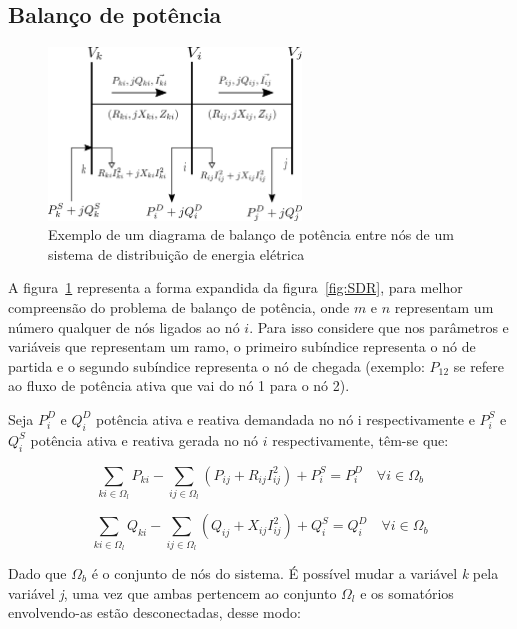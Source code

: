 \subsection{Balanço de potência}

\begin{figure}[H]
    \centering
    \includegraphics[width=0.6\textwidth]{3_Methodology/diagrama_nos.png}
    \caption{Exemplo de um diagrama de balanço de potência entre nós de um sistema de distribuição de energia elétrica}
    \label{fig:balanco_pot}
\end{figure}

A figura~\ref{fig:balanco_pot} representa a forma expandida da figura~\ref{fig:SDR}, para melhor compreensão do problema de balanço de potência, onde $m$ e $n$ representam um número qualquer de nós ligados ao nó $i$. 
Para isso considere que nos parâmetros e variáveis que representam um ramo, o primeiro subíndice representa o nó de partida e o segundo subíndice representa o nó de chegada (exemplo: $P_{12}$ se refere ao fluxo de potência ativa que vai do nó 1 para o nó 2).

Seja $P_{i}^{D}$ e $Q_{i}^{D}$ potência ativa e reativa demandada no nó i respectivamente e $P_{i}^{S}$ e $Q_{i}^{S}$ potência ativa e reativa gerada no nó $i$ respectivamente, têm-se que:

\begin{equation*}
    \sum_{ki\in\Omega_{l}}P_{ki} - \sum_{ij\in\Omega_{l}}(P_{ij} + R_{ij}I_{ij}^{2}) + P_{i}^{S} = P_{i}^{D}\quad\forall i \in\Omega_{b}
\end{equation*}

\begin{equation*}
    \sum_{ki\in\Omega_{l}}Q_{ki} - \sum_{ij\in\Omega_{l}}(Q_{ij} + X_{ij}I_{ij}^{2}) + Q_{i}^{S} = Q_{i}^{D}\quad\forall i \in\Omega_{b}
\end{equation*}

Dado que $\Omega_{b}$ é o conjunto de nós do sistema.
É possível mudar a variável \textit{k} pela variável \textit{j}, uma vez que ambas pertencem ao conjunto $\Omega_{l}$ e os somatórios envolvendo-as estão desconectadas, desse modo:

